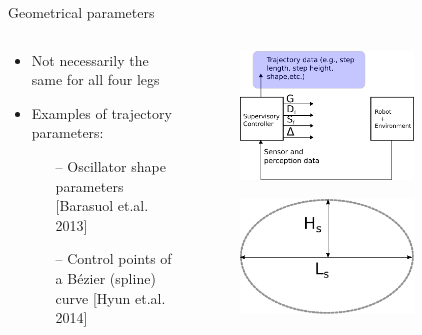 \documentclass[10pt]{beamer}
\begin{document}
\begin{frame}{Geometrical parameters}
		\begin{columns}
		\hspace{1cm}
		\begin{column}{0.5\textwidth}
		
		\begin{itemize}
			\setlength\itemsep{3em}
			\item Not necessarily the same for all four legs
			\item Examples of trajectory parameters:
			\begin{itemize}
			\item[--] Oscillator shape parameters [Barasuol et.al. 2013]
			\item[--] Control points of a B\'ezier (spline) curve [Hyun et.al. 2014]
			\end{itemize}
			
		
		\end{itemize}	
		
		\end{column}
		\begin{column}{0.5\textwidth}
			\begin{figure}[ht]\centering
				\includegraphics[width=0.75\textwidth]{images/Supervisory.pdf}
			\end{figure}
			\begin{figure}[ht]\centering
				\includegraphics[width=0.75\textwidth]{images/PrimitiveShape.pdf}
			\end{figure}	
		\end{column}
		\end{columns}
	\end{frame}
\end{document}
